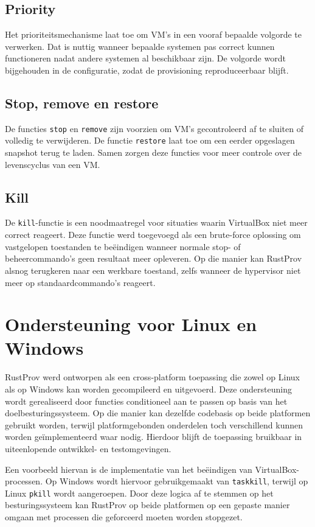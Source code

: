 \subsection{Priority}

Het prioriteitsmechanisme laat toe om VM's in een vooraf bepaalde volgorde te verwerken. Dat is nuttig wanneer bepaalde systemen pas correct kunnen functioneren nadat andere systemen al beschikbaar zijn. De volgorde wordt bijgehouden in de configuratie, zodat de provisioning reproduceerbaar blijft. 

\subsection{Stop, remove en restore}

De functies \texttt{stop} en \texttt{remove} zijn voorzien om VM's gecontroleerd af te sluiten of volledig te verwijderen. De functie \texttt{restore} laat toe om een eerder opgeslagen snapshot terug te laden. Samen zorgen deze functies voor meer controle over de levenscyclus van een VM.

\subsection{Kill}

De \texttt{kill}-functie is een noodmaatregel voor situaties waarin VirtualBox niet meer correct reageert. Deze functie werd toegevoegd als een brute-force oplossing om vastgelopen toestanden te beëindigen wanneer normale stop- of beheercommando's geen resultaat meer opleveren. Op die manier kan RustProv alsnog terugkeren naar een werkbare toestand, zelfs wanneer de hypervisor niet meer op standaardcommando's reageert.
\section{Ondersteuning voor Linux en Windows}

RustProv werd ontworpen als een cross-platform toepassing die zowel op Linux als op Windows kan worden gecompileerd en uitgevoerd. Deze ondersteuning wordt gerealiseerd door functies conditioneel aan te passen op basis van het doelbesturingssysteem. Op die manier kan dezelfde codebasis op beide platformen gebruikt worden, terwijl platformgebonden onderdelen toch verschillend kunnen worden geïmplementeerd waar nodig. Hierdoor blijft de toepassing bruikbaar in uiteenlopende ontwikkel- en testomgevingen.

Een voorbeeld hiervan is de implementatie van het beëindigen van VirtualBox-processen. Op Windows wordt hiervoor gebruikgemaakt van \texttt{taskkill}, terwijl op Linux \texttt{pkill} wordt aangeroepen. Door deze logica af te stemmen op het besturingssysteem kan RustProv op beide platformen op een gepaste manier omgaan met processen die geforceerd moeten worden stopgezet. 

